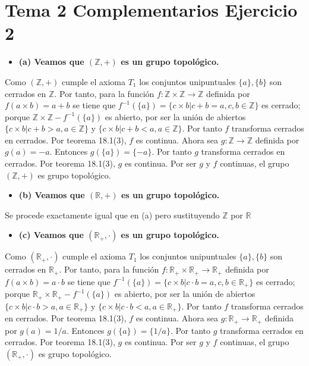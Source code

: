 \documentclass{article}
\begin{document}
\section{Tema 2 Complementarios Ejercicio 2}
\begin{itemize}
\item \bf (a) \rm Veamos que $(\mathbb{Z},+)$ es un grupo topológico.
\end{itemize}
Como $(\mathbb{Z},+)$ cumple el axioma $T_1$ los conjuntos unipuntuales $\{a\},\{b\}$ son cerrados en $\mathbb{Z}$. Por tanto, para la función $f:\mathbb{Z}\times\mathbb{Z}\rightarrow \mathbb{Z}$ definida por $f(a\times b)=a+b$ se tiene que $f^{-1}(\{a\})=\{c\times b|c+b=a,c,b\in\mathbb{Z}\}$ es cerrado; porque $\mathbb{Z}\times\mathbb{Z}-f^{-1}(\{a\})$ es abierto, por ser la unión de abiertos $\{c\times b|c+b>a,a\in \mathbb{Z}\}$ y $\{c\times b|c+b<a,a\in \mathbb{Z}\}$. Por tanto $f$ transforma cerrados en cerrados. Por teorema 18.1(3), $f$ es continua. Ahora sea $g:\mathbb{Z}\rightarrow \mathbb{Z}$ definida por $g(a)=-a$. Entonces $g(\{a\})=\{-a\}$. Por tanto $g$ transforma cerrados en cerrados. Por teorema 18.1(3), $g$ es continua. Por ser $g$ y $f$ continuas, el grupo $(\mathbb{Z},+)$ es grupo topológico.
\begin{itemize}
\item \bf (b) \rm Veamos que $(\mathbb{R},+)$ es un grupo topológico.
\end{itemize}
Se procede exactamente igual que en (a) pero sustituyendo $\mathbb{Z}$ por $\mathbb{R}$
\begin{itemize}
\item \bf (c) \rm Veamos que $(\mathbb{R}_+,\cdot)$ es un grupo topológico.
\end{itemize}
Como $(\mathbb{R}_+,\cdot)$ cumple el axioma $T_1$ los conjuntos unipuntuales $\{a\},\{b\}$ son cerrados en $\mathbb{R}_+$. Por tanto, para la función $f:\mathbb{R}_+\times\mathbb{R}_+\rightarrow \mathbb{R}_+$ definida por $f(a\times b)=a\cdot b$ se tiene que $f^{-1}(\{a\})=\{c\times b|c\cdot b=a,c,b\in\mathbb{R}_+\}$ es cerrado; porque $\mathbb{R}_+\times\mathbb{R}_+-f^{-1}(\{a\})$ es abierto, por ser la unión de abiertos $\{c\times b|c\cdot b>a,a\in \mathbb{R}_+\}$ y $\{c\times b|c\cdot b<a,a\in \mathbb{R}_+\}$. Por tanto $f$ transforma cerrados en cerrados. Por teorema 18.1(3), $f$ es continua. Ahora sea $g:\mathbb{R}_+\rightarrow \mathbb{R}_+$ definida por $g(a)=1/a$. Entonces $g(\{a\})=\{1/a\}$. Por tanto $g$ transforma cerrados en cerrados. Por teorema 18.1(3), $g$ es continua. Por ser $g$ y $f$ continuas, el grupo $(\mathbb{R}_+,\cdot)$ es grupo topológico.
\end{document}
